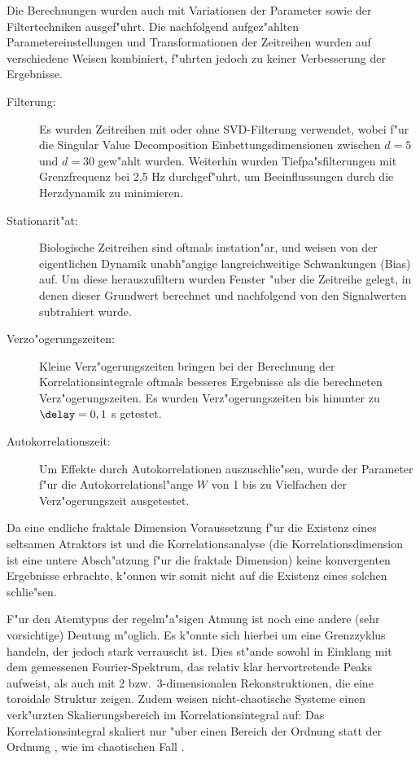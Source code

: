 Die Berechnungen wurden auch mit Variationen der Parameter sowie der Filtertechniken
ausgef"uhrt. Die nachfolgend aufgez"ahlten Parametereinstellungen und Transformationen der
Zeitreihen wurden auf verschiedene Weisen kombiniert, f"uhrten jedoch zu keiner
Verbesserung der Ergebnisse.
\begin{description}
\item[Filterung:] Es wurden Zeitreihen mit oder ohne SVD-Filterung verwendet, wobei f"ur
  die Singular Value Decomposition Einbettungsdimensionen zwischen $d=5$ und $d=30$
  gew"ahlt wurden. Weiterhin wurden Tiefpa"sfilterungen mit Grenzfrequenz bei 2,5 Hz
  durchgef"uhrt, um Beeinflussungen durch die Herzdynamik zu minimieren.
\item[Stationarit"at:] Biologische Zeitreihen sind oftmals instation"ar, und weisen von
  der eigentlichen Dynamik unabh"angige langreichweitige Schwankungen (Bias) auf. 
  Um diese herauszufiltern wurden Fenster "uber die Zeitreihe gelegt, in denen dieser
  Grundwert berechnet und nachfolgend von den Signalwerten subtrahiert wurde.
\item[Verzo"ogerungszeiten:] Kleine Verz"ogerungszeiten bringen bei der Berechnung der
  Korrelationsintegrale oftmals besseres Ergebnisse als die berechneten
  Verz"ogerungszeiten. Es wurden Verz"ogerungszeiten bis hinunter zu $\delay=0,1$ s
  getestet.
\item[Autokorrelationszeit:] Um Effekte durch Autokorrelationen auszuschlie"sen, wurde
  der Parameter f"ur die Autokorrelationsl"ange $W$ von 1 bis zu Vielfachen der
  Verz"ogerungszeit ausgetestet.
\end{description}
Da eine endliche fraktale Dimension Voraussetzung f"ur die Existenz eines seltsamen
Atraktors ist und die Korrelationsanalyse (die Korrelationsdimension ist eine untere
Absch"atzung f"ur die fraktale Dimension) keine konvergenten Ergebnisse erbrachte, k"onnen wir somit
nicht auf die Existenz eines solchen schlie"sen. 

F"ur den Atemtypus der regelm"a"sigen Atmung ist noch eine andere (sehr vorsichtige)
Deutung m"oglich. Es k"onnte sich hierbei um eine Grenzzyklus handeln, der jedoch stark
verrauscht ist. Dies st"ande sowohl in Einklang mit dem gemessenen Fourier-Spektrum, das
relativ klar hervortretende Peaks aufweist, als auch mit 2 bzw.\ 3-dimensionalen
Rekonstruktionen, die eine toroidale Struktur zeigen. Zudem weisen nicht-chaotische Systeme
einen verk"urzten Skalierungsbereich im Korrelationsintegral auf: Das Korrelationsintegral
skaliert nur "uber einen Bereich der Ordnung  statt der Ordnung , wie
im chaotischen Fall \cite{Theiler}.

